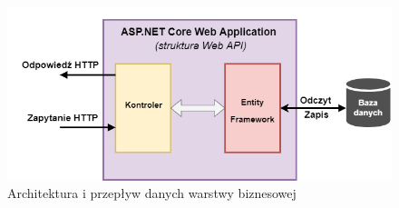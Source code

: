     \begin{figure}[ht]
	\centering
	\includegraphics[width=1\linewidth]{graphics/asp-net-web-api-architecture.png}
	\caption{Architektura i przepływ danych warstwy biznesowej}
	\label{fig:asp-net-web-api-architecture}
    \end{figure}

